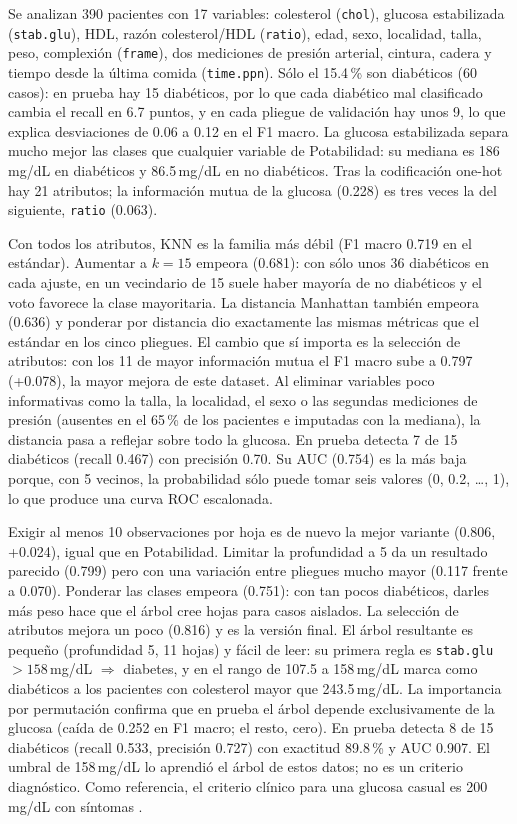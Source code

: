 Se analizan 390 pacientes con 17 variables: colesterol (\texttt{chol}), glucosa
estabilizada (\texttt{stab.glu}), HDL, razón colesterol/HDL (\texttt{ratio}), edad,
sexo, localidad, talla, peso, complexión (\texttt{frame}), dos mediciones de presión
arterial, cintura, cadera y tiempo desde la última comida (\texttt{time.ppn}). Sólo el
15.4\,\% son diabéticos (60 casos): en prueba hay 15 diabéticos, por lo que cada
diabético mal clasificado cambia el recall en 6.7 puntos, y en cada pliegue de
validación hay unos 9, lo que explica desviaciones de 0.06 a 0.12 en el F1 macro. La
glucosa estabilizada separa mucho mejor las clases que cualquier variable de
Potabilidad: su mediana es 186\,mg/dL en diabéticos y 86.5\,mg/dL en no diabéticos.
Tras la codificación one-hot hay 21 atributos; la información mutua de la glucosa
(0.228) es tres veces la del siguiente, \texttt{ratio} (0.063).

Con todos los atributos, KNN es la familia más débil (F1 macro 0.719 en el estándar).
Aumentar a $k=15$ empeora (0.681): con sólo unos 36 diabéticos en cada ajuste, en un
vecindario de 15 suele haber mayoría de no diabéticos y el voto favorece la clase
mayoritaria. La distancia Manhattan también empeora (0.636) y ponderar por distancia dio
exactamente las mismas métricas que el estándar en los cinco pliegues. El cambio que sí
importa es la selección de atributos: con los 11 de mayor información mutua el F1 macro
sube a 0.797 (+0.078), la mayor mejora de este dataset. Al eliminar variables poco
informativas como la talla, la localidad, el sexo o las segundas mediciones de presión
(ausentes en el 65\,\% de los pacientes e imputadas con la mediana), la distancia pasa
a reflejar sobre todo la glucosa. En prueba detecta 7 de 15 diabéticos (recall 0.467)
con precisión 0.70. Su AUC (0.754) es la más baja porque, con 5 vecinos, la
probabilidad sólo puede tomar seis valores (0, 0.2, \dots, 1), lo que produce una curva
ROC escalonada.

Exigir al menos 10 observaciones por hoja es de nuevo la mejor variante (0.806, +0.024),
igual que en Potabilidad. Limitar la profundidad a 5 da un resultado parecido (0.799)
pero con una variación entre pliegues mucho mayor (0.117 frente a 0.070). Ponderar las clases empeora (0.751): con
tan pocos diabéticos, darles más peso hace que el árbol cree hojas para casos
aislados. La selección de atributos mejora un poco (0.816) y es la versión final. El
árbol resultante es pequeño (profundidad 5, 11 hojas) y fácil de leer: su primera regla
es \texttt{stab.glu} $>158$\,mg/dL $\Rightarrow$ diabetes, y en el rango de 107.5 a
158\,mg/dL marca como diabéticos a los pacientes con colesterol mayor que 243.5\,mg/dL. La importancia por
permutación confirma que en prueba el árbol depende exclusivamente de la glucosa (caída
de 0.252 en F1 macro; el resto, cero). En prueba detecta 8 de 15 diabéticos (recall
0.533, precisión 0.727) con exactitud 89.8\,\% y AUC 0.907. El umbral de 158\,mg/dL lo
aprendió el árbol de estos datos; no es un criterio diagnóstico. Como referencia, el
criterio clínico para una glucosa casual es 200\,mg/dL con síntomas \cite{ada}.

